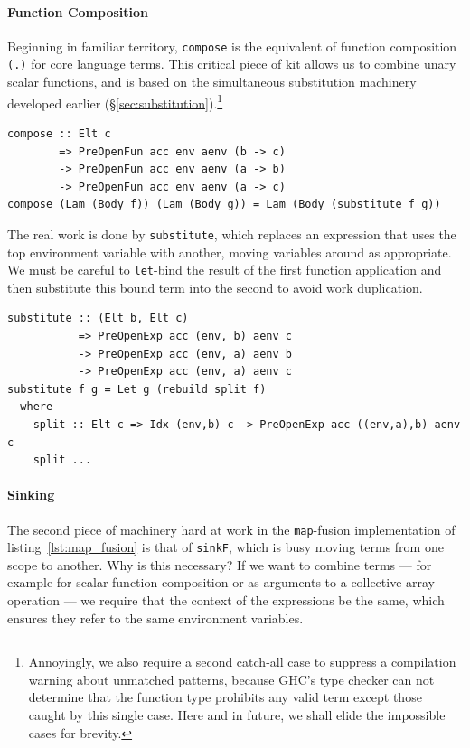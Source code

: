 \paragraph{Function Composition}

Beginning in familiar territory, \texttt{compose} is the equivalent of function
composition \texttt{(.)} for core language terms. This critical piece of kit
allows us to combine unary scalar functions, and is based on the simultaneous
substitution machinery developed earlier
(\S\ref{sec:substitution}).\footnote{Annoyingly, we also require a second
catch-all case to suppress a compilation warning about unmatched patterns,
because GHC's type checker can not determine that the function type prohibits
any valid term except those caught by this single case. Here and in future, we
shall elide the impossible cases for brevity.}
%
\begin{lstlisting}[style=haskell]
compose :: Elt c
        => PreOpenFun acc env aenv (b -> c)
        -> PreOpenFun acc env aenv (a -> b)
        -> PreOpenFun acc env aenv (a -> c)
compose (Lam (Body f)) (Lam (Body g)) = Lam (Body (substitute f g))
\end{lstlisting}
%
The real work is done by \texttt{substitute}, which replaces an expression that
uses the top environment variable with another, moving variables around as
appropriate. We must be careful to \texttt{let}-bind the result of the first
function application and then substitute this bound term into the second to
avoid work duplication.
%
\begin{lstlisting}[style=haskell]
substitute :: (Elt b, Elt c)
           => PreOpenExp acc (env, b) aenv c
           -> PreOpenExp acc (env, a) aenv b
           -> PreOpenExp acc (env, a) aenv c
substitute f g = Let g (rebuild split f)
  where
    split :: Elt c => Idx (env,b) c -> PreOpenExp acc ((env,a),b) aenv c
    split ...
\end{lstlisting}


\paragraph{Sinking}

The second piece of machinery hard at work in the \texttt{map}-fusion
implementation of listing~\ref{lst:map_fusion} is that of \texttt{sinkF}, which
is busy moving terms from one scope to another. Why is this necessary? If we
want to combine terms --- for example for scalar function composition or as
arguments to a collective array operation --- we require that the context of the
expressions be the same, which ensures they refer to the same environment
variables.

